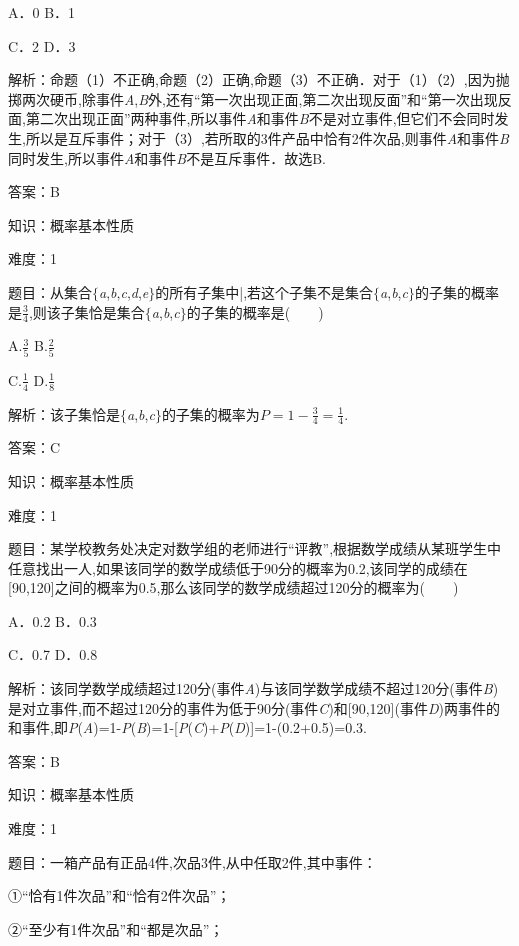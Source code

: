 \documentclass{article} %
\begin{document}
A．0  B．1

C．2  D．3

解析：命题（1）不正确,命题（2）正确,命题（3）不正确．对于（1）（2）,因为抛掷两次硬币,除事件\textit{A},\textit{B}外,还有``第一次出现正面,第二次出现反面''和``第一次出现反面,第二次出现正面''两种事件,所以事件\textit{A}和事件\textit{B}不是对立事件,但它们不会同时发生,所以是互斥事件；对于（3）,若所取的3件产品中恰有2件次品,则事件\textit{A}和事件\textit{B}同时发生,所以事件\textit{A}和事件\textit{B}不是互斥事件．故选B.

答案：B

知识：概率基本性质

难度：1

题目：从集合$\mathrm{\{}$\textit{a},\textit{b},\textit{c},\textit{d},\textit{e}$\mathrm{\}}$的所有子集中|,若这个子集不是集合$\mathrm{\{}$\textit{a},\textit{b},\textit{c}$\mathrm{\}}$的子集的概率是$\frac{3}{4}$,则该子集恰是集合$\mathrm{\{}$\textit{a},\textit{b},\textit{c}$\mathrm{\}}$的子集的概率是(　　)

A.$\frac{3}{5}$  B.$\frac{2}{5}$

C.$\frac{1}{4}$  D.$\frac{1}{8}$

解析：该子集恰是$\mathrm{\{}$\textit{a},\textit{b},\textit{c}$\mathrm{\}}$的子集的概率为$P=1-\frac{3}{4}=\frac{1}{4}$.

答案：C

知识：概率基本性质

难度：1

题目：某学校教务处决定对数学组的老师进行``评教'',根据数学成绩从某班学生中任意找出一人,如果该同学的数学成绩低于90分的概率为0.2,该同学的成绩在[90,120]之间的概率为0.5,那么该同学的数学成绩超过120分的概率为(　　)

A．0.2  B．0.3

C．0.7  D．0.8

解析：该同学数学成绩超过120分(事件\textit{A})与该同学数学成绩不超过120分(事件\textit{B})是对立事件,而不超过120分的事件为低于90分(事件\textit{C})和[90,120](事件\textit{D})两事件的和事件,即\textit{P}(\textit{A})=1-\textit{P}(\textit{B})=1-[\textit{P}(\textit{C})+\textit{P}(\textit{D})]=1-(0.2+0.5)=0.3.

答案：B

知识：概率基本性质

难度：1

题目：一箱产品有正品4件,次品3件,从中任取2件,其中事件：

①``恰有1件次品''和``恰有2件次品''；

②``至少有1件次品''和``都是次品''；
\end{document}
